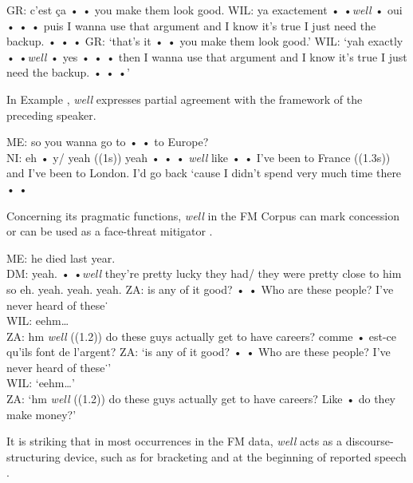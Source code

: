 \documentclass[output=paper]{langscibook}
\begin{document}
\begin{exe}
    \ex\label{hennecke:ex:43} GR: c’est ça • • you make them look good.
     \glt WIL: ya exactement • •\textit{well} • oui • • • puis I wanna use that argument and I know it’s true I just need the backup. • • •
    \glt GR: ‘that’s it • • you make them look good.’
    \glt WIL: ‘yah exactly • •\textit{well} • yes • • • then I wanna use that argument and I know it’s true I just need the backup. • • •'
\end{exe}


In Example , \textit{well} expresses partial agreement with the framework of the preceding speaker.

\begin{exe}
    \ex\label{hennecke:ex:44} ME: so you wanna go to • • to Europe? \\
    NI: eh • y/ yeah ((1s)) yeah • • • \textit{well} like • • I’ve been to France ((1.3s)) and I’ve been to London. I’d go back ‘cause I didn’t spend very much time there • •
\end{exe}


Concerning its pragmatic functions, \textit{well} in the FM Corpus can mark concession  or can be used as a face-threat mitigator .

\begin{exe}
    \ex\label{hennecke:ex:45} ME: he died last year. \\
    DM: yeah. • •\textit{well} they’re pretty lucky they had/ they were pretty close to him so eh. yeah. yeah. yeah.
    \ex\label{hennecke:ex:46} ZA: is any of it good? • • Who are these people? I’ve never heard of these˙ \\
    WIL: eehm… \\
    ZA: hm \textit{well} ((1.2)) do these guys actually get to have careers? comme • est-ce qu’ils font de l’argent?
    \glt ZA: ‘is any of it good? • • Who are these people? I’ve never heard of these˙’ \\
    WIL: ‘eehm…’ \\
    ZA: ‘hm \textit{well} ((1.2)) do these guys actually get to have careers? Like • do they make money?’
\end{exe}


It is striking that in most occurrences in the FM data, \textit{well} acts as a discourse-structuring device, such as for bracketing  and at the beginning of reported speech .
\end{document}
